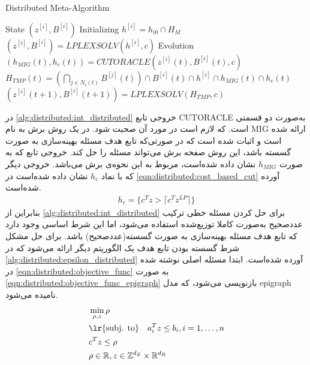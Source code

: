 \begin{latin}
	\begin{algorithm}
		\caption{Distributed Meta-Algorithm}
		\label{alg:distributed:int_distributed}
		\begin{algorithmic}[1]
			\Statex State $(z^{[i]},B^{[i]})$
			\Statex Initializing    
			\State $h^{[i]} = h_{i0} \cap H_M$
			\State $(z^{[i]},B^{[i]}) = LPLEXSOLV(h^{[i]}, c)$
			\Statex Evolution 
			\State $(h_{MIG}(t),h_c(t)) = CUTORACLE(z^{[i]}(t),B^{[i]}(t),c)$
			\State $\displaystyle H_{TMP}(t) = (\bigcap_{j \in N_i(t)}B^{[j]}(t)) \cap B^{[i]}(t) \cap h^{[i]} \cap h_{MIG}(t) \cap h_c(t)$
			\State $(z^{[i]}(t+1),B^{[i]}(t+1)) = LPLEXSOLV(H_{TMP}, c)$
		\end{algorithmic}
	\end{algorithm}
\end{latin}
در \cref{alg:distributed:int_distributed} خروجی تابع CUTORACLE به‌صورت دو قسمتی است. که لازم است در مورد آن صحبت شود. در \cite{gomory1960algorithm} یک روش برش به نام MIG ارائه شده است و اثبات شده است که در صورتی‌که تابع هدف مسئله بهینه‌سازی به صورت گسسته باشد، این روش صفحه برش می‌تواند مسئله را حل کند. خروجی تابع که به صورت $h_{MIG}$ نشان داده شده‌است، مربوط به این نحوه‌ی برش می‌باشد. خروجی دیگر که با نماد $h_c$ نشان داده شده‌است در \cref{eqn:distributed:cost_based_cut} آورده شده‌است. 
\begin{align}\label{eqn:distributed:cost_based_cut}
	h_c = \{ c^Tz > \lceil c^Tz^{LP}\rceil \}	
\end{align}
	بنابراین از \cref{alg:distributed:int_distributed} برای حل کردن مسئله خطی ترکیب عددصحیح به‌صورت کاملا توزیع‌شده استفاده می‌شود، اما این شرط اساسی وجود دارد که تابع هدف مسئله بهینه‌سازی به صورت گسسته(عددصحیح) باشد. 
	برای حل مشکل شرط گسسته بودن تابع هدف یک الگوریتم دیگر ارائه می‌شود که در \cref{alg:distributed:epsilon_distributed} آورده شده‌است. ابتدا مسئله اصلی نوشته شده در \cref{eqn:distributed:objective_func} به صورت \cref{eqn:distributed:objective_func_epigraph} بازنویسی می‌شود، که مدل epigraph نامیده می‌شود. 
	\begin{subequations}\label{eqn:distributed:objective_func_epigraph}
		\begin{align}
		&\min_{\rho,z}\rho \\
		&\text{\lr{subj. to}} \quad a_i^Tz \le b_i, i = 1, \dots, n  \\
		&c^Tz \le \rho \\
		&\rho \in \mathbb{R}, z \in \mathbb{Z}^{d_Z} \times \mathbb{R}^{d_R} \\
		\end{align}
	\end{subequations}
